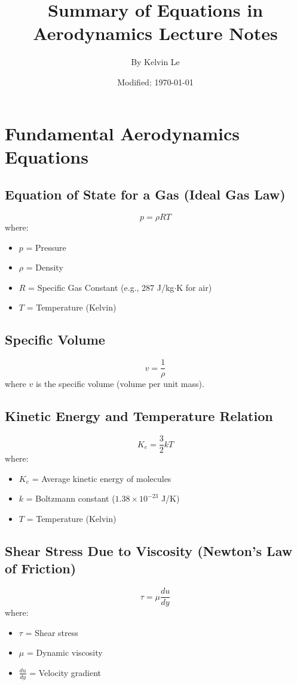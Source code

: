 \documentclass{article}
\begin{document}
\title{Summary of Equations in Aerodynamics Lecture Notes}
\author{By Kelvin Le}
\date{Modified: \today}
\maketitle

\section{Fundamental Aerodynamics Equations}

\subsection{Equation of State for a Gas (Ideal Gas Law)}
\begin{equation}
    p = \rho R T
\end{equation}
where:
\begin{itemize}
    \item $p$ = Pressure
    \item $\rho$ = Density
    \item $R$ = Specific Gas Constant (e.g., 287 J/kg$\cdot$K for air)
    \item $T$ = Temperature (Kelvin)
\end{itemize}

\subsection{Specific Volume}
\begin{equation}
    v = \frac{1}{\rho}
\end{equation}
where $v$ is the specific volume (volume per unit mass).

\subsection{Kinetic Energy and Temperature Relation}
\begin{equation}
    K_e = \frac{3}{2} k T
\end{equation}
where:
\begin{itemize}
    \item $K_e$ = Average kinetic energy of molecules
    \item $k$ = Boltzmann constant ($1.38 \times 10^{-23}$ J/K)
    \item $T$ = Temperature (Kelvin)
\end{itemize}

\subsection{Shear Stress Due to Viscosity (Newton’s Law of Friction)}
\begin{equation}
    \tau = \mu \frac{du}{dy}
\end{equation}
where:
\begin{itemize}
    \item $\tau$ = Shear stress
    \item $\mu$ = Dynamic viscosity
    \item $\frac{du}{dy}$ = Velocity gradient
\end{itemize}
\end{document}
